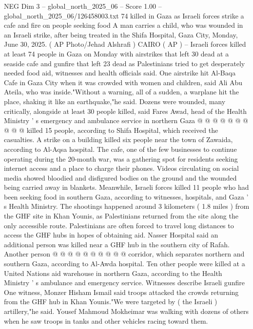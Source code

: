\begin{textsample}{NEG Dim 3 – global\_north\_2025\_06 – Score 1.00 – global\_north\_2025\_06/126458003.txt}  \label{ex:f3_neg_368}
74 killed in Gaza as Israeli forces strike a cafe and fire on people seeking food A man carries a child, who was wounded in an Israeli strike, after being treated in the Shifa Hospital, Gaza City, Monday, June 30, 2025. ( AP Photo/Jehad Alshrafi ) CAIRO ( AP ) -- Israeli forces killed at least 74 people in Gaza on Monday with airstrikes that left 30 dead at a seaside cafe and gunfire that left 23 dead as Palestinians tried to get desperately needed food aid, witnesses and health officials said.
One airstrike hit Al-Baqa Cafe in Gaza City when it was crowded with women and children, said Ali Abu Ateila, who was inside."Without a warning, all of a sudden, a warplane hit the place, shaking it like an earthquake,"he said.
Dozens were wounded, many critically, alongside at least 30 people killed, said Fares Awad, head of the Health Ministry ' s emergency and ambulance service in northern Gaza @ @ @ @ @ @ @ @ @ @ killed 15 people, according to Shifa Hospital, which received the casualties.
A strike on a building killed six people near the town of Zawaida, according to Al-Aqsa hospital.
The cafe, one of the few businesses to continue operating during the 20-month war, was a gathering spot for residents seeking internet access and a place to charge their phones.
Videos circulating on social media showed bloodied and disfigured bodies on the ground and the wounded being carried away in blankets.
Meanwhile, Israeli forces killed 11 people who had been seeking food in southern Gaza, according to witnesses, hospitals, and Gaza ' s Health Ministry.
The shootings happened around 3 kilometers ( 1.8 miles ) from the GHF site in Khan Younis, as Palestinians returned from the site along the only accessible route.
Palestinians are often forced to travel long distances to access the GHF hubs in hopes of obtaining aid.
Nasser Hospital said an additional person was killed near a GHF hub in the southern city of Rafah.
Another person @ @ @ @ @ @ @ @ @ @ corridor, which separates northern and southern Gaza, according to Al-Awda hospital.
Ten other people were killed at a United Nations aid warehouse in northern Gaza, according to the Health Ministry ' s ambulance and emergency service.
Witnesses describe Israeli gunfire One witness, Monzer Hisham Ismail said troops attacked the crowds returning from the GHF hub in Khan Younis."We were targeted by ( the Israeli ) artillery,"he said.
Yousef Mahmoud Mokheimar was walking with dozens of others when he saw troops in tanks and other vehicles racing toward them.

\end{textsample}
